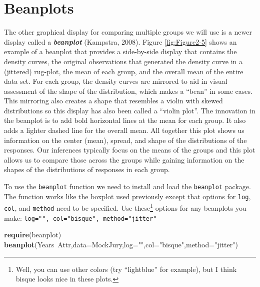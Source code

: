 \documentclass[]{book}
\newenvironment{Shaded}{\begin{snugshade}}{\end{snugshade}}
\newcommand{\KeywordTok}[1]{\textcolor[rgb]{0.13,0.29,0.53}{\textbf{{#1}}}}
\newcommand{\DataTypeTok}[1]{\textcolor[rgb]{0.13,0.29,0.53}{{#1}}}
\newcommand{\StringTok}[1]{\textcolor[rgb]{0.31,0.60,0.02}{{#1}}}
\newcommand{\NormalTok}[1]{{#1}}
\let\rmarkdownfootnote\footnote%
\def\footnote{\protect\rmarkdownfootnote}
\begin{document}
\section{Beanplots}\label{section_2-2}

The other graphical display for comparing multiple groups we will use is
a newer display called a \textbf{\emph{beanplot}} (Kampstra, 2008).
Figure \ref{fig:Figure2-5} shows an example of a beanplot that provides
a side-by-side display that contains the density curves, the original
observations that generated the density curve in a (jittered) rug-plot,
the mean of each group, and the overall mean of the entire data set. For
each group, the density curves are mirrored to aid in visual assessment
of the shape of the distribution, which makes a ``bean'' in some cases.
This mirroring also creates a shape that resembles a violin with skewed
distributions so this display has also been called a ``violin plot''.
The innovation in the beanplot is to add bold horizontal lines at the
mean for each group. It also adds a lighter dashed line for the overall
mean. All together this plot shows us information on the center (mean),
spread, and shape of the distributions of the responses. Our inferences
typically focus on the means of the groups and this plot allows us to
compare those across the groups while gaining information on the shapes
of the distributions of responses in each group.

To use the \texttt{beanplot} function we need to install and load the
\texttt{beanplot} package. The function works like the boxplot used
previously except that options for \texttt{log}, \texttt{col}, and
\texttt{method} need to be specified. Use these\footnote{Well, you can
  use other colors (try ``lightblue'' for example), but I think bisque
  looks nice in these plots.} options for any beanplots you make:
\texttt{log="",\ col="bisque",\ method="jitter"}




\begin{Shaded}
\begin{Highlighting}[]
\KeywordTok{require}\NormalTok{(beanplot)}
\KeywordTok{beanplot}\NormalTok{(Years~Attr,}\DataTypeTok{data=}\NormalTok{MockJury,}\DataTypeTok{log=}\StringTok{""}\NormalTok{,}\DataTypeTok{col=}\StringTok{"bisque"}\NormalTok{,}\DataTypeTok{method=}\StringTok{"jitter"}\NormalTok{)}
\end{Highlighting}
\end{Shaded}
\end{document}
